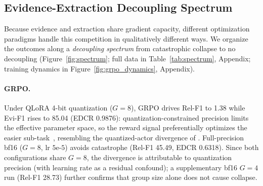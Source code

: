 \begin{table}[t]
\centering
\caption{Main results on DocRED dev (Qwen3-4B). Ign-F1 shows mean $\pm$ std$^{(\text{seeds})}$; other metrics are same-seed means. Best \textbf{bold}; best evidence-generating \underline{underlined}. Per-seed: Appendix~\ref{tab:ablation_full}.}
\label{tab:main}
\small
{}
\vspace{-2mm}
\end{table}


\subsection{Evidence-Extraction Decoupling Spectrum}
\label{sec:spectrum}

Because evidence and extraction share gradient capacity, different optimization paradigms handle this competition in qualitatively different ways. We organize the outcomes along a \emph{decoupling spectrum} from catastrophic collapse to no decoupling (Figure~\ref{fig:spectrum}; full data in Table~\ref{tab:spectrum}, Appendix; training dynamics in Figure~\ref{fig:grpo_dynamics}, Appendix).

\paragraph{GRPO.}
Under QLoRA 4-bit quantization ($G{=}8$), GRPO drives Rel-F1 to 1.38 while Evi-F1 rises to 85.04 (EDCR 0.9876): quantization-constrained precision limits the effective parameter space, so the reward signal preferentially optimizes the easier sub-task~\citep{gao2023scaling}, resembling the quantized-actor divergence of \citet{li2026qurl}. Full-precision bf16 ($G{=}8$, lr $5\text{e-}5$) avoids catastrophe (Rel-F1 45.49, EDCR 0.6318). Since both configurations share $G{=}8$, the divergence is attributable to quantization precision (with learning rate as a residual confound); a supplementary bf16 $G{=}4$ run (Rel-F1 28.73) further confirms that group size alone does not cause collapse.

